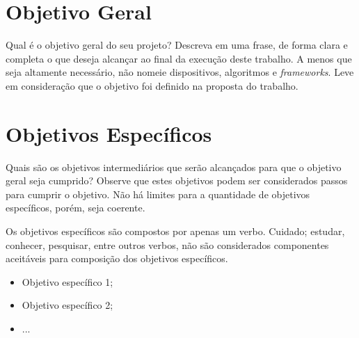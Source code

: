 \section{Objetivo Geral}
\label{sec:ObjGeral}

Qual é o objetivo geral do seu projeto? Descreva em uma frase, de forma clara e completa o que deseja alcançar ao final da execução deste trabalho. A menos que seja altamente necessário, não nomeie dispositivos, algoritmos e \textit{frameworks}. Leve em consideração que o objetivo foi definido na proposta do trabalho.

\section{Objetivos Específicos}
\label{sec:ObjEspecificos}

Quais são os objetivos intermediários que serão alcançados para que o objetivo geral seja cumprido? Observe que estes objetivos podem ser considerados passos para cumprir o objetivo. Não há limites para a quantidade de objetivos específicos, porém, seja coerente.

Os objetivos específicos são compostos por apenas um verbo. Cuidado; estudar, conhecer, pesquisar, entre outros verbos, não são considerados componentes aceitáveis para composição dos objetivos específicos.

\begin{itemize}
    \item Objetivo específico 1;
    \item Objetivo específico 2;
    \item ...
\end{itemize}

